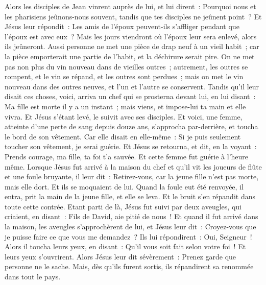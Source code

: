 \begin{multicols}{2}
Alors les disciples de Jean vinrent auprès de lui, et lui dirent~: Pourquoi nous et les pharisiens jeûnons-nous souvent, tandis que tes disciples ne jeûnent point~?
Et Jésus leur répondit~: Les amis de l'époux peuvent-ils s'affliger pendant que l'époux est avec eux~? Mais les jours viendront où l'époux leur sera enlevé, alors ils jeûneront.
Aussi personne ne met une pièce de drap neuf à un vieil habit~; car la pièce emporterait une partie de l'habit, et la déchirure serait pire.
On ne met pas non plus du vin nouveau dans de vieilles outres~; autrement, les outres se rompent, et le vin se répand, et les outres sont perdues~; mais on met le vin nouveau dans des outres neuves, et l'un et l'autre se conservent.
Tandis qu'il leur disait ces choses, voici, arriva un chef qui se prosterna devant lui, en lui disant~: Ma fille est morte il y a un instant~; mais viens, et impose-lui ta main et elle vivra.
Et Jésus s'étant levé, le suivit avec ses disciples.
Et voici, une femme, atteinte d'une perte de sang depuis douze ans, s'approcha par-derrière, et toucha le bord de son vêtement.
Car elle disait en elle-même~: Si je puis seulement toucher son vêtement, je serai guérie.
Et Jésus se retourna, et dit, en la voyant~: Prends courage, ma fille, ta foi t'a sauvée. Et cette femme fut guérie à l'heure même.
Lorsque Jésus fut arrivé à la maison du chef et qu'il vit les joueurs de flûte et une foule bruyante,
il leur dit~: Retirez-vous, car la jeune fille n'est pas morte, mais elle dort. Et ils se moquaient de lui.
Quand la foule eut été renvoyée, il entra, prit la main de la jeune fille, et elle se leva.
Et le bruit s'en répandit dans toute cette contrée.
Etant parti de là, Jésus fut suivi par deux aveugles, qui criaient, en disant~: Fils de David, aie pitié de nous~!
Et quand il fut arrivé dans la maison, les aveugles s'approchèrent de lui, et Jésus leur dit~: Croyez-vous que je puisse faire ce que vous me demandez~? Ils lui répondirent~: Oui, Seigneur~!
Alors il toucha leurs yeux, en disant~: Qu'il vous soit fait selon votre foi~!
Et leurs yeux s'ouvrirent. Alors Jésus leur dit sévèrement~: Prenez garde que personne ne le sache.
Mais, dès qu'ils furent sortis, ils répandirent sa renommée dans tout le pays.

\end{multicols}
